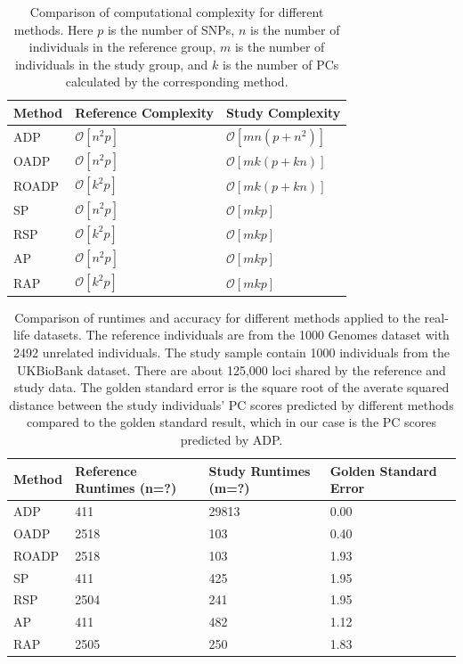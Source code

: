 \documentclass{article}
\newcommand{\bO}{\mathcal{O}}
\begin{document}
\newpage





\newpage

\begin{table} 
  \centering
  \begin{tabular}{|l|l|l|}
    \hline
    Method & Reference Complexity & Study Complexity \\ 
    \hline
    ADP & $\bO[n^2 p]$ & $\bO[mn(p + n^2)]$ \\
    \hline
    OADP & $\bO[n^2 p]$ & $\bO[mk(p + k n)]$ \\
    \hline
    ROADP & $\bO[k^2 p]$ & $\bO[mk(p + k n)]$ \\
    \hline
    SP & $\bO[n^2p]$ & $\bO[mkp]$ \\
    \hline
    RSP & $\bO[k^2p]$ & $\bO[mkp]$ \\
    \hline
    AP & $\bO[n^2p]$ &  $\bO[mkp]$ \\
    \hline
    RAP & $\bO[k^2p]$ &  $\bO[mkp]$ \\
    \hline
  \end{tabular}
  \caption{
    Comparison of computational complexity for different methods.
    Here $p$ is the number of SNPs,
    $n$ is the number of individuals in the reference group,
    $m$ is the number of individuals in the  study group,
    and $k$ is the number of PCs calculated by the corresponding method.
  }
  \label{tbl:cplx}
\end{table}

\begin{table} 
  \centering
  \begin{tabular}{|l|l|l|l|l|}
    \hline
    Method & Reference Runtimes (n=?) & Study Runtimes (m=?)& Golden Standard Error \\ 
    \hline
    ADP & 411 & 29813 & 0.00 \\
    \hline
    OADP & 2518 & 103 & 0.40 \\
    \hline
    ROADP & 2518 & 103 & 1.93 \\
    \hline
    SP & 411 & 425 & 1.95 \\
    \hline
    RSP & 2504 & 241 & 1.95 \\
    \hline
    AP & 411 & 482 & 1.12 \\
    \hline
    RAP & 2505 & 250 & 1.83 \\ 
    \hline
  \end{tabular}
  \caption{
    Comparison of runtimes and accuracy for different methods applied to the real-life datasets.
    The reference individuals are from the 1000 Genomes dataset with 2492 unrelated individuals.
    The study sample contain 1000 individuals from the UKBioBank dataset.
    There are about 125,000 loci shared by the reference and study data.
    The golden standard error is the square root of the averate squared distance between the study individuals' PC scores predicted by different methods compared to the golden standard result, which in our case is the PC scores predicted by ADP.
  }
  \label{tbl:ukb}
\end{table} 
\end{document}
